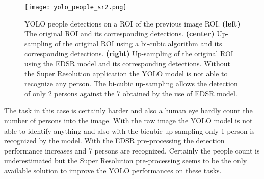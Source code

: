 \documentclass{standalone}
\begin{document}
\begin{figure}[htbp]
\centering
\texttt{[image: yolo\_people\_sr2.png]}
\caption{YOLO people detections on a ROI of the previous image ROI.
\textbf{(left)} The original ROI and its corresponding detections.
\textbf{(center)} Up-sampling of the original ROI using a bi-cubic algorithm and its corresponding detections.
\textbf{(right)} Up-sampling of the original ROI using the EDSR model and its corresponding detections.
Without the Super Resolution application the YOLO model is not able to recognize any person.
The bi-cubic up-sampling allows the detection of only 2 persons against the 7 obtained by the use of EDSR model.
}
\label{fig:yolo_sr2}
\end{figure}

The task in this case is certainly harder and also a human eye hardly count the number of persons into the image.
With the raw image the YOLO model is not able to identify anything and also with the bicubic up-sampling only 1 person is recognized by the model.
With the EDSR pre-processing the detection performance increases and 7 persons are recognized.
Certainly the people count is underestimated but the Super Resolution pre-processing seems to be the only available solution to improve the YOLO performances on these tasks.
\end{document}

